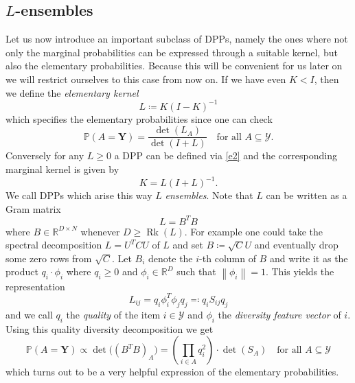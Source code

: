\subsection*{\(L\)-ensembles}
Let us now introduce an important subclass of DPPs, namely the ones where not only the marginal probabilities can be expressed through a suitable kernel, but also the elementary probabilities. Because this will be convenient for us later on we will restrict ourselves to this case from now on. If we have even \(K<I\), then we define the \emph{elementary kernel}
\[L\coloneqq K(I-K)^{-1} \]
which specifies the elementary probabilities since one can check
\begin{equation}\label{e3}
\mathbb P(A=\mathbf Y) = \frac{\det(L_A)}{\det(I+L)} \quad\text{for all } A\subseteq\mathcal Y.
\end{equation}
Conversely for any \(L\ge0\) a DPP can be defined via \eqref{e2} and the corresponding marginal kernel is given by
\[K=L(I+L)^{-1}.\]
We call DPPs which arise this way \(L\) \emph{ensembles}. Note that \(L\) can be written as a Gram matrix%
\[L=B^TB\]
where \(B\in\mathbb R^{D\times N}\) whenever \(D\ge \operatorname{Rk}(L)\). For example one could take the spectral decomposition \(L = U^TCU\) of \(L\) and set \(B\coloneqq \sqrt{C} U\) and eventually drop some zero rows from \(\sqrt{C}\). Let \(B_i\) denote the \(i\)-th column of \(B\) and write it as the product \(q_i\cdot \phi_i\) where \(q_i\ge0\) and \(\phi_i\in\mathbb R^D\) such that \(\left\lVert \phi_i \right\rVert=1\). This yields the representation
\[L_{ij} = q_i \phi_i^T\phi_j q_j \eqqcolon q_i S_{ij}q_j\]
and we call \(q_i\) the \emph{quality} of the item \(i\in \mathcal Y\) and \(\phi_i\) the \emph{diversity feature vector} of \(i\). %
Using this quality diversity decomposition we get
\begin{equation}\label{e4}
\mathbb P(A=\mathbf Y) \propto \det\!\big((B^TB)_A\big) = \left(\prod_{i\in A} q_i^2\right) \cdot \det(S_A) \quad \text{for all } A\subseteq\mathcal Y
\end{equation}
which turns out to be a very helpful expression of the elementary probabilities.%

